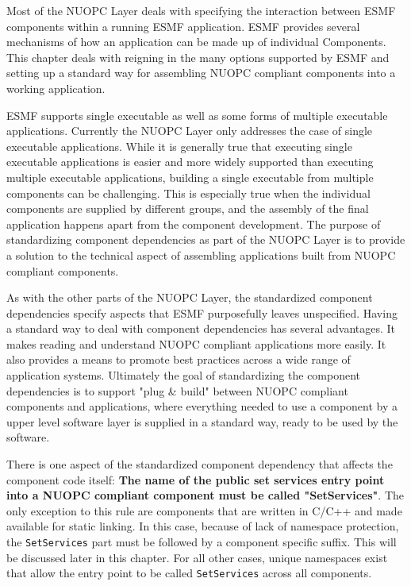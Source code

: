 
Most of the NUOPC Layer deals with specifying the interaction between ESMF components within a running ESMF application. ESMF provides several mechanisms of how an application can be made up of individual Components. This chapter deals with reigning in the many options supported by ESMF and setting up a standard way for assembling NUOPC compliant components into a working application.

ESMF supports single executable as well as some forms of multiple executable applications. Currently the NUOPC Layer only addresses the case of single executable applications. While it is generally true that executing single executable applications is easier and more widely supported than executing multiple executable applications, building a single executable from multiple components can be challenging. This is especially true when the individual components are supplied by different groups, and the assembly of the final application happens apart from the component development. The purpose of standardizing component dependencies as part of the NUOPC Layer is to provide a solution to the technical aspect of assembling applications built from NUOPC compliant components.

As with the other parts of the NUOPC Layer, the standardized component dependencies specify aspects that ESMF purposefully leaves unspecified. Having a standard way to deal with component dependencies has several advantages. It makes reading and understand NUOPC compliant applications more easily. It also provides a means to promote best practices across a wide range of application systems. Ultimately the goal of standardizing the component dependencies is to support "plug \& build" between NUOPC compliant components and applications, where everything needed to use a component by a upper level software layer is supplied in a standard way, ready to be used by the software.

There is one aspect of the standardized component dependency that affects the component code itself: {\bf The name of the public set services entry point into a NUOPC compliant component must be called "SetServices"}. The only exception to this rule are components that are written in C/C++ and made available for static linking. In this case, because of lack of namespace protection, the {\tt SetServices} part must be followed by a component specific suffix. This will be discussed later in this chapter. For all other cases, unique namespaces exist that allow the entry point to be called {\tt SetServices} across all components.

